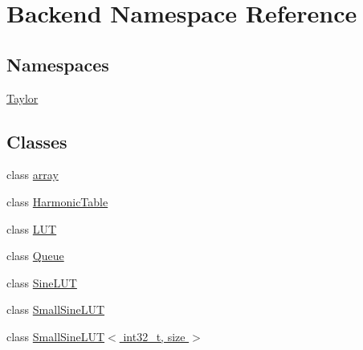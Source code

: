 \hypertarget{namespace_backend}{\section{Backend Namespace Reference}
\label{namespace_backend}
}
\subsection*{Namespaces}
\begin{DoxyCompactItemize}
\item 
 \hyperlink{namespace_backend_1_1_taylor}{Taylor}
\end{DoxyCompactItemize}
\subsection*{Classes}
\begin{DoxyCompactItemize}
\item 
class \hyperlink{class_backend_1_1array}{array}
\item 
class \hyperlink{class_backend_1_1_harmonic_table}{Harmonic\+Table}
\item 
class \hyperlink{class_backend_1_1_l_u_t}{L\+U\+T}
\item 
class \hyperlink{class_backend_1_1_queue}{Queue}
\item 
class \hyperlink{class_backend_1_1_sine_l_u_t}{Sine\+L\+U\+T}
\item 
class \hyperlink{class_backend_1_1_small_sine_l_u_t}{Small\+Sine\+L\+U\+T}
\item 
class \hyperlink{class_backend_1_1_small_sine_l_u_t_3_01int32__t_00_01size_01_4}{Small\+Sine\+L\+U\+T$<$ int32\+\_\+t, size $>$}
\end{DoxyCompactItemize}
